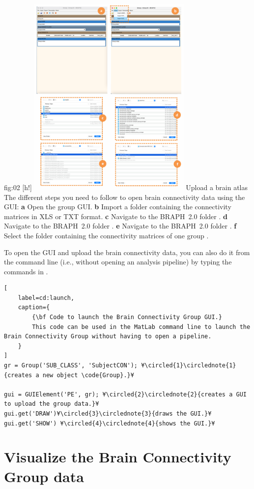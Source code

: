\documentclass[justified]{tufte-handout}
\begin{document}
	{fig:02}
	{
	[h!]
	\includegraphics[height=10cm]{tut_gr_conn/fig02.png}
	}
	{Upload a brain atlas}
	{
	The different steps you need to follow to open brain connectivity data using the GUI: 
	{\bf a} Open the group GUI.
	{\bf b} Import a folder containing the connectivity matrices in XLS or TXT format.
	{\bf c} Navigate to the BRAPH~2.0 folder .
	{\bf d} Navigate to the BRAPH~2.0 folder .
	{\bf e} Navigate to the BRAPH~2.0 folder .
	{\bf f} Select the folder containing the connectivity matrices of one group .
	}

To open the GUI and upload the brain connectivity data, you can also do it from the command line (i.e., without opening an analysis pipeline) by typing the commands in .
%
\begin{lstlisting}[
	label=cd:launch,
	caption={
		{\bf Code to launch the Brain Connectivity Group GUI.}
		This code can be used in the MatLab command line to launch the Brain Connectivity Group without having to open a pipeline.
	}
]
gr = Group('SUB_CLASS', 'SubjectCON'); ¥\circled{1}\circlednote{1}{creates a new object \code{Group}.}¥

gui = GUIElement('PE', gr); ¥\circled{2}\circlednote{2}{creates a GUI to upload the group data.}¥
gui.get('DRAW')¥\circled{3}\circlednote{3}{draws the GUI.}¥
gui.get('SHOW') ¥\circled{4}\circlednote{4}{shows the GUI.}¥
\end{lstlisting}

\clearpage
\section{Visualize the Brain Connectivity Group data}
\end{document}
